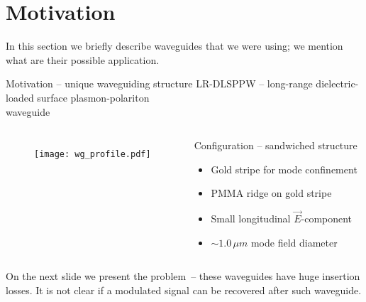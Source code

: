 


\section{Motivation}
  In this section we briefly describe waveguides that we were using; we
  mention what are their possible application.
  \begin{frame}{Motivation -- unique waveguiding structure}
    LR-DLSPPW -- long-range dielectric-loaded surface plasmon-polariton\\
    \hfill waveguide \cite{volkov_long-range_2011}
    \begin{columns}
        \begin{figure}
          \texttt{[image: wg\_profile.pdf]}
        \end{figure}
        \begin{block}{Configuration -- sandwiched structure}
          \begin{itemize}
           \item Gold stripe for mode confinement
           \item PMMA ridge on gold stripe
           \item Small longitudinal $\vec{E}$-component
           \item $\sim 1.0\,\mu{}m$ mode field diameter
          \end{itemize}
        \end{block}
    \end{columns}
  \end{frame}
  
  On the next slide we present the problem~-- these waveguides have huge
  insertion losses. It is not clear if a modulated signal can be recovered
  after such waveguide.

